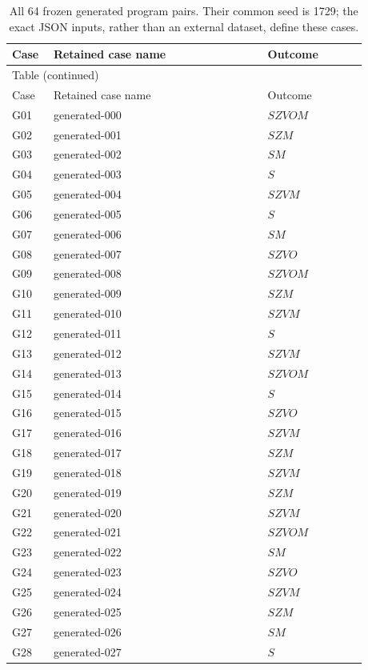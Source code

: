 \begin{longtable}{@{}p{0.09\linewidth}p{0.54\linewidth}p{0.25\linewidth}@{}}
\caption{All 64 frozen generated program pairs. Their common seed is 1729; the exact JSON inputs, rather than an external dataset, define these cases.}\label{tab:diagnostic-catalog}\\
\toprule Case & Retained case name & Outcome\\\midrule\endfirsthead
\multicolumn{3}{l}{Table \thetable{} (continued)}\\
\toprule Case & Retained case name & Outcome\\\midrule\endhead
\bottomrule\endfoot
G01 & generated-000 & $SZVOM$\\
G02 & generated-001 & $SZM$\\
G03 & generated-002 & $SM$\\
G04 & generated-003 & $S$\\
G05 & generated-004 & $SZVM$\\
G06 & generated-005 & $S$\\
G07 & generated-006 & $SM$\\
G08 & generated-007 & $SZVO$\\
G09 & generated-008 & $SZVOM$\\
G10 & generated-009 & $SZM$\\
G11 & generated-010 & $SZVM$\\
G12 & generated-011 & $S$\\
G13 & generated-012 & $SZVM$\\
G14 & generated-013 & $SZVOM$\\
G15 & generated-014 & $S$\\
G16 & generated-015 & $SZVO$\\
G17 & generated-016 & $SZVM$\\
G18 & generated-017 & $SZM$\\
G19 & generated-018 & $SZVM$\\
G20 & generated-019 & $SZM$\\
G21 & generated-020 & $SZVM$\\
G22 & generated-021 & $SZVOM$\\
G23 & generated-022 & $SM$\\
G24 & generated-023 & $SZVO$\\
G25 & generated-024 & $SZVM$\\
G26 & generated-025 & $SZM$\\
G27 & generated-026 & $SM$\\
G28 & generated-027 & $S$\\

\end{longtable}

